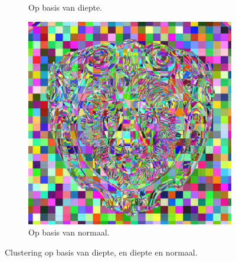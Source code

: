 \begin{figure}[tb]
\begin{subfigure}[b]{0.32\textwidth}
    \caption{Op basis van diepte.}
    \label{fig:cs-opdeling-voorbeeld:depth}
  \end{subfigure}%
  \begin{subfigure}[b]{0.32\textwidth}
    \includegraphics[width=\textwidth]{./img/raw/cs-opdeling-voorbeeld/normal.png}
    \caption{Op basis van normaal.}
    \label{fig:cs-opdeling-voorbeeld:normaal}
  \end{subfigure}
  \caption{Clustering op basis van diepte, en diepte en normaal.}
  \label{fig:cs-opdeling-voorbeeld}
\end{figure}
